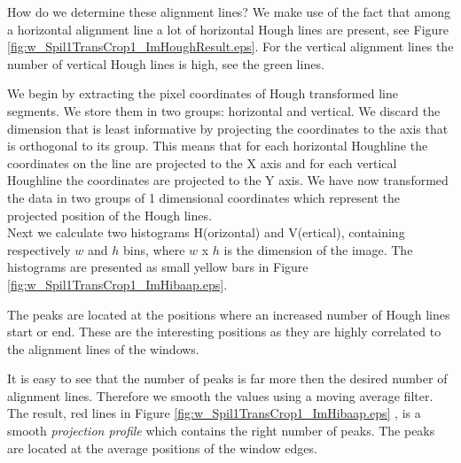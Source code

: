 

How do we determine these alignment lines? We make use of the fact that among a
horizontal alignment line a lot of horizontal Hough lines are present, see
Figure \ref{fig:w_Spil1TransCrop1_ImHoughResult.eps}. For the vertical alignment lines
the number of vertical Hough lines is high, see the green lines.

We begin by extracting the pixel coordinates of Hough transformed line
segments. We store them in two groups: horizontal and vertical.%
We discard the dimension that is least informative by projecting the coordinates to
the axis that is orthogonal to its group. 
This means that for each horizontal Houghline the coordinates on the line are projected to the X
axis and for each vertical Houghline the coordinates are projected to the Y
axis. We have now transformed the data in two groups of 1 dimensional
coordinates which represent the projected position of the Hough lines.\\

Next we calculate two histograms H(orizontal) and V(ertical), containing respectively
$w$ and $h$ bins, where $w$ x $h$ is the dimension of the image.  The histograms
are presented as small yellow bars in Figure \ref{fig:w_Spil1TransCrop1_ImHibaap.eps}.

The peaks are located at the positions where an increased number of Hough lines
start or end.  These are the interesting positions as they are highly correlated
to the alignment lines of the windows. 

It is easy to see that the number of peaks is far more then the desired number of alignment lines.
Therefore we smooth the values using a moving average filter.
The result, red lines in Figure \ref{fig:w_Spil1TransCrop1_ImHibaap.eps}
, is a smooth \emph{projection profile} which contains the right number of peaks. The peaks
are located at the average positions of the window edges. \\

